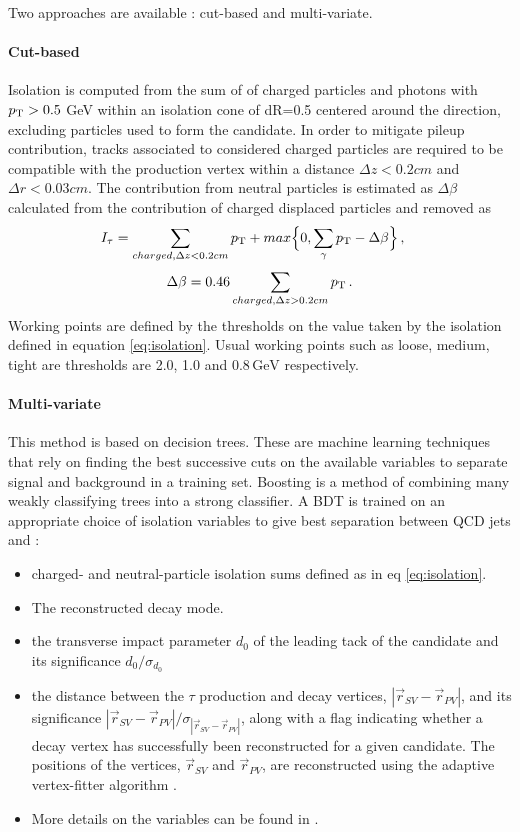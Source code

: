 Two approaches are available : cut-based and multi-variate.

\paragraph{Cut-based} Isolation is computed from the sum of \pt of charged particles and photons with $p_{\mathrm{T}} > 0.5$ GeV within an isolation cone of dR=0.5 centered around the \tauh direction, excluding particles used to form the \tauh candidate. In order to mitigate pileup contribution, tracks associated to considered charged particles are required to be compatible with the \tauh production vertex within a distance $\Delta z < 0.2 cm$ and $\Delta r < 0.03 cm$. The contribution from neutral particles is estimated as $\Delta \beta$ calculated from the contribution of charged displaced particles and removed as
\begin{equation}
    I_{\tau} = \sum_{charged, \Delta z<0.2 cm} \pt + max \Big\{ 0, \sum_{\gamma} \pt - \Delta\beta \Big\} \msep
    \label{eq:isolation}
\end{equation}
\begin{equation}
    \Delta \beta = 0.46 \sum_{charged,\Delta z>0.2 cm} \pt \mend
\end{equation}
Working points are defined by the thresholds on the value taken by the isolation defined in equation \ref{eq:isolation}. Usual working points such as loose, medium, tight are thresholds are 2.0, 1.0 and $0.8\,\mathrm{GeV}$ respectively.

\paragraph{Multi-variate} This method is based on decision trees. These are machine learning techniques that rely on finding the best successive cuts on the available variables to separate signal and background in a training set. Boosting is a method of combining many weakly classifying trees into a strong classifier. A BDT is trained on an appropriate choice of isolation variables to give best separation between QCD jets and \tauh : 
    \begin{itemize}
        \item charged- and neutral-particle isolation sums defined as in eq \ref{eq:isolation}.
        \item The reconstructed decay mode.
        \item the transverse impact parameter $d_0$ of the leading tack of the \tauh candidate and its significance $d_0 / \sigma_{d_0}$
        \item the distance between the $\tau$ production and decay vertices, $|\Vec{r}_{SV} - \Vec{r}_{PV}|$, and its significance $|\Vec{r}_{SV} - \Vec{r}_{PV}|/\sigma_{|\Vec{r}_{SV} - \Vec{r}_{PV}|}$, along with a flag indicating whether a decay vertex has successfully been reconstructed for a given \tauh candidate. The positions of the vertices, $\Vec{r}_{SV}$ and $\Vec{r}_{PV}$, are reconstructed using the adaptive vertex-fitter algorithm \cite{Waltenberger_2007}.
        \item More details on the variables can be found in \cite{tauh_reconstruction}.
    \end{itemize}

